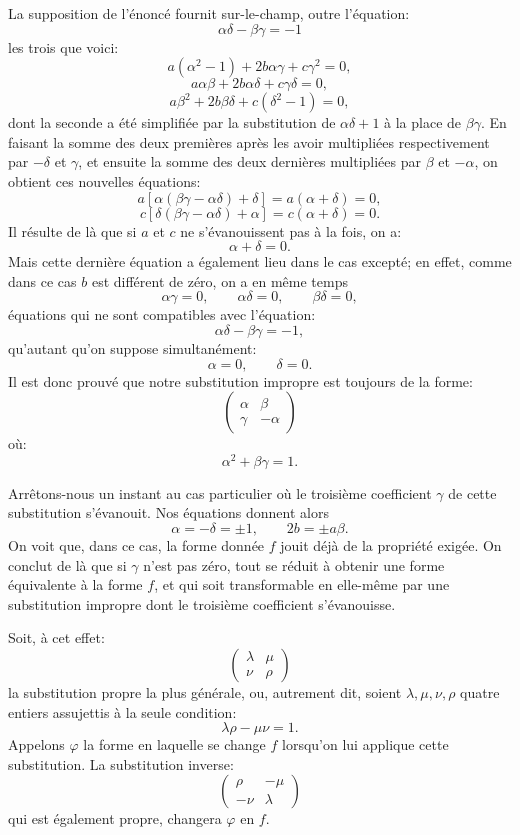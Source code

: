 \documentclass[11pt]{article}
\begin{document}
La supposition de l'énoncé fournit sur-le-champ, outre l'équation:
\[
\alpha\delta-\beta\gamma=-1
\]
les trois que voici:
\[
a(\alpha^2-1)+2b\alpha\gamma+c\gamma^2=0,
\]
\[
a\alpha\beta+2b\alpha\delta+c\gamma\delta=0,
\]
\[
a\beta^2+2b\beta\delta+c(\delta^2-1)=0,
\]
dont la seconde a été simplifiée par la substitution de \(\alpha\delta+1\) à la place de \(\beta\gamma\). En faisant la somme des deux premières après les avoir multipliées respectivement par \(-\delta\) et \(\gamma\), et ensuite la somme des deux dernières multipliées par \(\beta\) et \(-\alpha\), on obtient ces nouvelles équations:
\[
a[\alpha(\beta\gamma-\alpha\delta)+\delta]=a(\alpha+\delta)=0,
\]
\[
c[\delta(\beta\gamma-\alpha\delta)+\alpha]=c(\alpha+\delta)=0.
\]
Il résulte de là que si \(a\) et \(c\) ne s'évanouissent pas à la fois, on a:
\[
\alpha+\delta=0.
\]
Mais cette dernière équation a également lieu dans le cas excepté; en effet, comme dans ce cas \(b\) est différent de zéro, on a en même temps
\[
\alpha\gamma=0,\qquad \alpha\delta=0,\qquad \beta\delta=0,
\]
équations qui ne sont compatibles avec l'équation:
\[
\alpha\delta-\beta\gamma=-1,
\]
qu'autant qu'on suppose simultanément:
\[
\alpha=0,\qquad \delta=0.
\]
Il est donc prouvé que notre substitution impropre est toujours de la forme:
\[
\begin{pmatrix}\alpha&\beta\\ \gamma&-\alpha\end{pmatrix}
\]
où:
\[
\alpha^2+\beta\gamma=1.
\]

Arrêtons-nous un instant au cas particulier où le troisième coefficient \(\gamma\) de cette substitution s'évanouit. Nos équations donnent alors
\[
\alpha=-\delta=\pm1,\qquad 2b=\pm a\beta.
\]
On voit que, dans ce cas, la forme donnée \(f\) jouit déjà de la propriété exigée. On conclut de là que si \(\gamma\) n'est pas zéro, tout se réduit à obtenir une forme équivalente à la forme \(f\), et qui soit transformable en elle-même par une substitution impropre dont le troisième coefficient s'évanouisse.

Soit, à cet effet:
\[
\begin{pmatrix}\lambda&\mu\\ \nu&\rho\end{pmatrix}
\]
la substitution propre la plus générale, ou, autrement dit, soient \(\lambda,\mu,\nu,\rho\) quatre entiers assujettis à la seule condition:
\[
\lambda\rho-\mu\nu=1.
\]
Appelons \(\varphi\) la forme en laquelle se change \(f\) lorsqu'on lui applique cette substitution. La substitution inverse:
\[
\begin{pmatrix}\rho&-\mu\\ -\nu&\lambda\end{pmatrix}
\]
qui est également propre, changera \(\varphi\) en \(f\).
\end{document}
